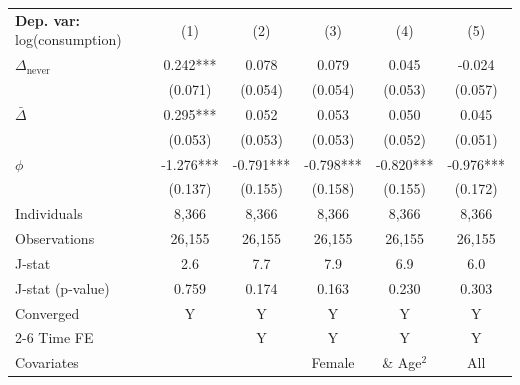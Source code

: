 \begin{tabular}{l ccccc} \toprule  \textbf{Dep. var:}  log(consumption) 
                    &\multicolumn{1}{c}{(1)}   &\multicolumn{1}{c}{(2)}   &\multicolumn{1}{c}{(3)}   &\multicolumn{1}{c}{(4)}   &\multicolumn{1}{c}{(5)}   \\

\addlinespace
$\Delta_{\text{never}}$&       0.242***&       0.078   &       0.079   &       0.045   &      -0.024   \\
                    &     (0.071)   &     (0.054)   &     (0.054)   &     (0.053)   &     (0.057)   \\

\addlinespace
$\bar{\Delta}$      &       0.295***&       0.052   &       0.053   &       0.050   &       0.045   \\
                    &     (0.053)   &     (0.053)   &     (0.053)   &     (0.052)   &     (0.051)   \\

\addlinespace
$\phi$              &      -1.276***&      -0.791***&      -0.798***&      -0.820***&      -0.976***\\
                    &     (0.137)   &     (0.155)   &     (0.158)   &     (0.155)   &     (0.172)   \\
\addlinespace
Individuals         &       8,366   &       8,366   &       8,366   &       8,366   &       8,366   \\
Observations        &      26,155   &      26,155   &      26,155   &      26,155   &      26,155   \\
J-stat              &         2.6   &         7.7   &         7.9   &         6.9   &         6.0   \\
J-stat (p-value)    &       0.759   &       0.174   &       0.163   &       0.230   &       0.303   \\
Converged           &           Y   &           Y   &           Y   &           Y   &           Y   \\
\cmidrule{2-6} Time FE & & Y & Y & Y & Y \\ Covariates & & & Female & \& Age$^2$ & All \\ \bottomrule \end{tabular}
